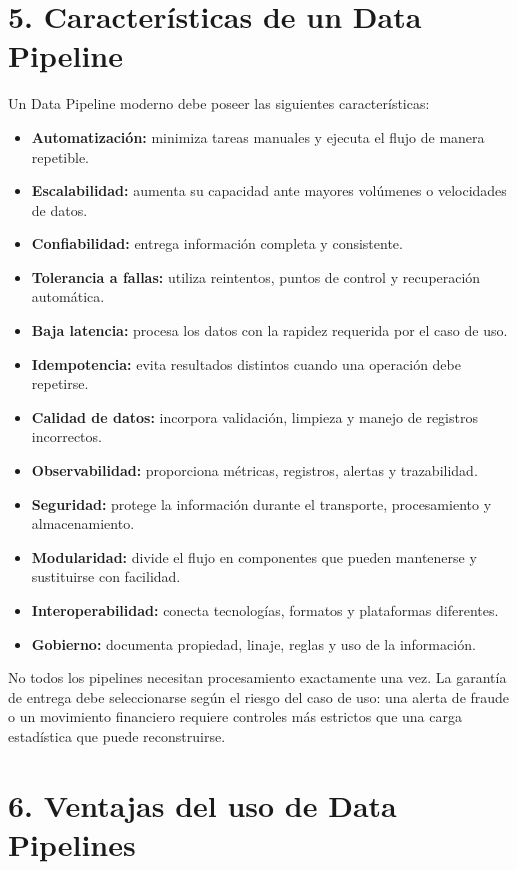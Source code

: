 \section*{5. Características de un Data Pipeline}

Un Data Pipeline moderno debe poseer las siguientes características:

\begin{itemize}
    \item \textbf{Automatización:} minimiza tareas manuales y ejecuta el flujo de manera repetible.
    \item \textbf{Escalabilidad:} aumenta su capacidad ante mayores volúmenes o velocidades de datos.
    \item \textbf{Confiabilidad:} entrega información completa y consistente.
    \item \textbf{Tolerancia a fallas:} utiliza reintentos, puntos de control y recuperación automática.
    \item \textbf{Baja latencia:} procesa los datos con la rapidez requerida por el caso de uso.
    \item \textbf{Idempotencia:} evita resultados distintos cuando una operación debe repetirse.
    \item \textbf{Calidad de datos:} incorpora validación, limpieza y manejo de registros incorrectos.
    \item \textbf{Observabilidad:} proporciona métricas, registros, alertas y trazabilidad.
    \item \textbf{Seguridad:} protege la información durante el transporte, procesamiento y almacenamiento.
    \item \textbf{Modularidad:} divide el flujo en componentes que pueden mantenerse y sustituirse con facilidad.
    \item \textbf{Interoperabilidad:} conecta tecnologías, formatos y plataformas diferentes.
    \item \textbf{Gobierno:} documenta propiedad, linaje, reglas y uso de la información.
\end{itemize}

No todos los pipelines necesitan procesamiento exactamente una vez. La garantía
de entrega debe seleccionarse según el riesgo del caso de uso: una alerta de
fraude o un movimiento financiero requiere controles más estrictos que una
carga estadística que puede reconstruirse.

\section*{6. Ventajas del uso de Data Pipelines}

